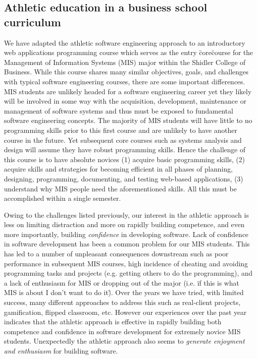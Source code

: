 \subsection{Athletic education in a business school curriculum}
We have adapted the athletic software engineering approach to an introductory web applications programming course which serves as the entry \"core\" course for the Management of Information Systems (MIS) major within the Shidler College of Business. While this course shares many similar objectives, goals, and challenges with typical software engineering courses, there are some important differences. MIS students are unlikely headed for a software engineering career yet they likely will be involved in some way with the acquisition, development, maintenance or management of software systems and thus must be exposed to fundamental software engineering concepts. The majority of MIS students will have little to no programming skills prior to this first course and are unlikely to have another course in the future. Yet subsequent core courses such as systems analysis and design will assume they have robust programming skills. Hence the challenge of this course is to have absolute novices (1) acquire basic programming skills, (2) acquire skills and strategies for becoming efficient in all phases of planning, designing, programming, documenting, and testing web-based applications, (3) understand why MIS people need the aforementioned skills. All this must be accomplished within a single semester. 

Owing to the challenges listed previously, our interest in the athletic approach is less on limiting distraction and more on rapidly building competence, and even more importantly, building {\em confidence} in developing software. Lack of confidence in software development has been a common problem for our MIS students. This has led to a number of unpleasant consequences downstream such as poor performance in subsequent MIS courses, high incidence of cheating and avoiding programming tasks and projects (e.g. getting others to do the programming), and a lack of enthusiasm for MIS or dropping out of the major (i.e. \"if this is what MIS is about I don't want to do it\"). Over the years we have tried, with limited success, many different approaches to address this such as real-client projects, gamification, flipped classroom, etc. However our experiences over the past year indicates that the athletic approach is effective in rapidly building both competence and confidence in software development for extremely novice MIS students. Unexpectedly the athletic approach also seems to {\em generate enjoyment and enthusiasm} for building software. 

